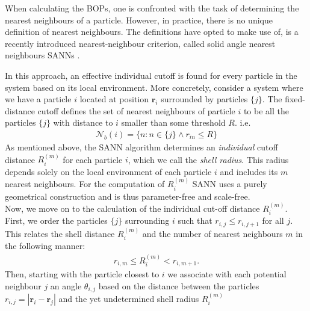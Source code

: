 \documentclass{article}
\begin{document}
When calculating the BOPs, one is confronted with the task of determining the nearest neighbours of a particle.
 However, in practice, there is no unique definition of nearest neighbours. 
 The definitions have opted to make use of, is a recently introduced nearest-neighbour criterion, called solid angle nearest neighbours SANNs \cite{sanns}.
 
 
In this approach, an effective individual cutoff is found for every particle in the system based on its local environment.
More concretely, consider a system where we have a particle $i$ located at position $\bm{r}_i$ surrounded by particles $\{j\}$. 
The fixed-distance cutoff defines the set of nearest neighbours of particle $i$ to be all the particles $\{j\}$ with distance to $i$ smaller than some threshold $R$. i.e.
\begin{align}
	\mathcal{N}_b(i)=\{n:n\in \{j\}\wedge r_{in}\leq R\}
\end{align}
As mentioned above, the SANN algorithm determines an \textit{individual} cutoff distance $R_i^{(m)}$ for each particle $i$, which we call the \textit{shell radius}. 
This radius depends solely on the local environment of each particle $i$ and includes its $m$ nearest neighbours. 
For the computation of $R_i^{(m)}$ SANN uses a purely geometrical construction and is thus parameter-free and scale-free.
\\

Now, we move on to the calculation of the individual cut-off distance $R_i^{(m)}$.
First, we order the particles $\{j\}$ surrounding $i$ such that $r_{i,j}\leq r_{i,j+1}$ for all $j$. This relates the shell distance $R_i^{(m)}$ and the number of nearest neighbours $m$ in the following manner:
\begin{align}
	r_{i,m}\leq R_i^{(m)}<r_{i,m+1}. \label{shell_radius_rel}
\end{align}
Then, starting with the particle closest to $i$ we associate with each potential neighbour $j$ an angle $\theta_{i,j}$ based on the distance between the particles $r_{i,j}=|\bm{r}_i-\bm{r}_j|$ and the yet undetermined shell radius $R_i^{(m)}$
\end{document}
